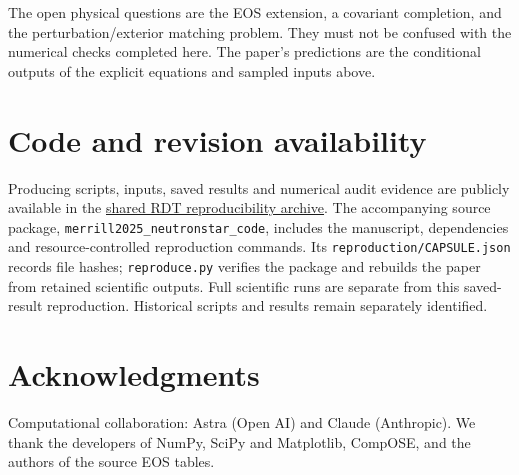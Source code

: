 \documentclass[twocolumn,prd,superscriptaddress,nofootinbib]{revtex4-2}
\begin{document}
The open physical questions are the EOS extension, a covariant completion,
and the perturbation/exterior matching problem. They must not be confused
with the numerical checks completed here. The paper's predictions are the
conditional outputs of the explicit equations and sampled inputs above.

\section*{Code and revision availability}
Producing scripts, inputs, saved results and numerical audit evidence are
publicly available in the \href{https://github.com/chrismerrill1974/solarcore_code/tree/main/reproduction}{shared RDT reproducibility archive}.
The accompanying source package, \nolinkurl{merrill2025_neutronstar_code}, includes the
manuscript, dependencies and resource-controlled reproduction commands.
Its \texttt{reproduction/CAPSULE.json} records file hashes;
\texttt{reproduce.py} verifies the package and rebuilds the paper from retained
scientific outputs. Full scientific runs are separate from this saved-result
reproduction. Historical scripts and results remain separately identified.

\section*{Acknowledgments}
Computational collaboration: Astra (Open AI) and Claude (Anthropic).
We thank the developers of NumPy, SciPy and Matplotlib, CompOSE, and the
authors of the source EOS tables.
\end{document}
